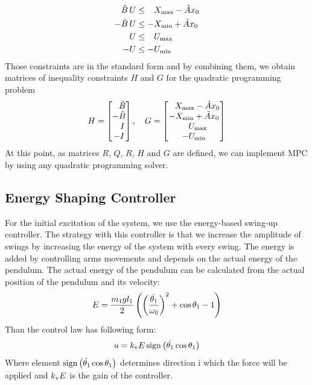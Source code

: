 \begin{subequations}
	\begin{align}
	\tilde{B}\,U &\leq \ \; \,X _{\text{max}} - \tilde{A}x_0\\
	-\tilde{B}\,U &\leq -X _{\text{min}} + \tilde{A}x_0\\
	U &\leq \ \; \,U _{\text{max}}\\
	-U &\leq -U _{\text{min}}
	\end{align}
\end{subequations}
Those constraints are in the standard form and by combining them, we obtain matrices of inequality constraints $H$ and $G$ for the quadratic programming problem
\begin{equation}
	H = \begin{bmatrix}
	\ \; \,\tilde{B}\\
	-\tilde{B}\\
	\ \ \, I\\
	-I\\
	\end{bmatrix}, \quad
	G = \begin{bmatrix}
	\ \; \,X _{\text{max}} - \tilde{A}x_0\\
	-X _{\text{min}} + \tilde{A}x_0\\
	\ \ \:U _{\text{max}}\\
	-U _{\text{min}}
	\end{bmatrix}
\end{equation}
At this point, as matrices $R$, $Q$, $R$, $H$ and $G$ are defined, we can implement MPC by using any quadratic programming solver.
\subsection{Energy Shaping Controller}
For the initial excitation of the system, we use the energy-based swing-up controller. The strategy with this controller is that we increase the amplitude of swings by increasing the energy of the system with every swing. The energy is added by controlling arms movements and depends on the actual energy of the pendulum. The actual energy of the pendulum can be calculated from the actual position of the pendulum and its velocity: 
\begin{equation}
E = \frac{m_1gl_1}{2}\left( \left( \frac{\dot{\theta_1}}{\omega_0} \right)^2+\cos\theta_1 - 1 \right)
\end{equation}
Than the control law has following form:
\begin{equation}\label{energy-shaping}
	u = k _{\text{v}}E\,\mathrm{sign}\left( \dot{\theta_1}\cos\theta_1 \right)
\end{equation}
Where element $\mathrm{sign}\left( \dot{\theta_1}\cos\theta_1 \right)$ determines direction i which the force will be applied and $k _{\text{v}}E$ is the gain of the controller.
\newpage
